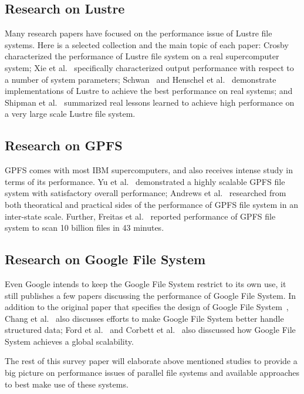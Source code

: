 

\subsection{Research on Lustre}
Many research papers have focused on the performance issue of 
Lustre file systems. 
%
Here is a selected collection and the main topic of each paper:
Crosby~\cite{Crosby2009} characterized the performance of Lustre file system
on a real supercomputer system;
%
Xie et al.~\cite{Xie2012} specifically characterized output performance
with respect to a number of system parameters;
%
Schwan~\cite{Schwan2003} and Henschel et al.~\cite{Henschel2012} 
demonstrate implementations of Lustre to achieve the best performance
on real systems; and
%
Shipman et al.~\cite{Shipman2010} summarized real lessons learned 
to achieve high performance on a very large scale Lustre file system.


\subsection{Research on GPFS}
GPFS comes with most IBM supercomputers, and also receives intense study
in terms of its performance.
%
Yu et al.~\cite{Yu2006} demonstrated a highly scalable GPFS file system
with satisfactory overall performance;
%
Andrews et al.~\cite{Andrews2005} researched from both theoratical 
and practical sides of the performance of GPFS file system
in an inter-state scale.
%
Further, Freitas et al.~\cite{freitas2011gpfs} reported performance 
of GPFS file system to scan 10 billion files in 43 minutes. 


\subsection{Research on Google File System}
Even Google intends to keep the Google File System restrict
to its own use, it still publishes a few papers discussing the 
performance of Google File System.
%
In addition to the original paper that specifies the design of
Google File System~\cite{ghemawat2003google},
Chang et al.~\cite{Chang2006a} also discusses efforts to make Google
File System better handle structured data;
Ford et al.~\cite{Ford2010a} and Corbett et al.~\cite{Corbett2012a}
also disscussed how Google File System achieves a global scalability.


The rest of this survey paper will elaborate above mentioned studies 
to provide a big picture on performance issues of parallel file systems
and available approaches to best make use of these systems.
